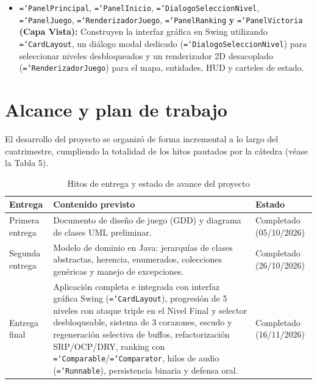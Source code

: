 \documentclass[12pt, a4paper]{article}
\DeclareRobustCommand{\code}[1]{\textcolor{codegreen}{\texttt{\hyphenchar\font=`\-#1}}}
\begin{document}
\begin{itemize}[leftmargin=1.27cm, before=]
    \item \code{PanelPrincipal}, \code{PanelInicio}, \code{DialogoSeleccionNivel}, \code{PanelJuego}, \code{RenderizadorJuego}, \code{PanelRanking} \textbf{y} \code{PanelVictoria} \textbf{(Capa Vista):} Construyen la interfaz gráfica en Swing utilizando \code{CardLayout}, un diálogo modal dedicado (\code{DialogoSeleccionNivel}) para seleccionar niveles desbloqueados y un renderizador 2D desacoplado (\code{RenderizadorJuego}) para el mapa, entidades, HUD y carteles de estado.
\end{itemize}

\section{Alcance y plan de trabajo}

El desarrollo del proyecto se organizó de forma incremental a lo largo del cuatrimestre, cumpliendo la totalidad de los hitos pautados por la cátedra (véase la Tabla 5).

\begin{table}[H]
\caption{Hitos de entrega y estado de avance del proyecto}
\begin{tabularx}{\textwidth}{@{} >{\raggedright\arraybackslash}p{3.4cm} >{\raggedright\arraybackslash}X >{\raggedright\arraybackslash}p{3.0cm} @{}}
\toprule
\textbf{Entrega} & \textbf{Contenido previsto} & \textbf{Estado} \\
\midrule
Primera entrega & Documento de diseño de juego (GDD) y diagrama de clases UML preliminar. & Completado (05/10/2026) \\
\addlinespace[5pt]
Segunda entrega & Modelo de dominio en Java: jerarquías de clases abstractas, herencia, enumerados, colecciones genéricas y manejo de excepciones. & Completado (26/10/2026) \\
\addlinespace[5pt]
Entrega final & Aplicación completa e integrada con interfaz gráfica Swing (\code{CardLayout}), progresión de 5 niveles con ataque triple en el Nivel Final y selector desbloqueable, sistema de 3 corazones, escudo y regeneración selectiva de buffos, refactorización SRP/OCP/DRY, ranking con \code{Comparable}/\code{Comparator}, hilos de audio (\code{Runnable}), persistencia binaria y defensa oral. & Completado (16/11/2026) \\
\bottomrule
\end{tabularx}
\end{table}
\end{document}
